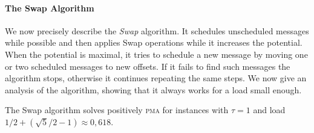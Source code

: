 \documentclass[a4paper,UKenglish,cleveref, autoref, thm-restate]{lipics-v2019}
\newcommand\pma{\textsc{pma}\xspace}
\begin{document}
\paragraph{The Swap Algorithm}


We now precisely describe the \emph{Swap} algorithm. It schedules unscheduled messages while possible and then applies Swap operations while it increases the potential. When the potential is maximal, it tries to schedule a new message by moving one or two scheduled messages to new offsets. If it fails to find such messages the algorithm stops, otherwise 
it continues repeating the same steps. We now give an analysis of the algorithm, showing that it always works for a load small enough.

\begin{theorem}
The Swap algorithm solves positively \pma for instances with $\tau =1$ and load $1/2 + (\sqrt{5}/2 -1) \approx 0,618$.
\end{theorem}
\end{document}
